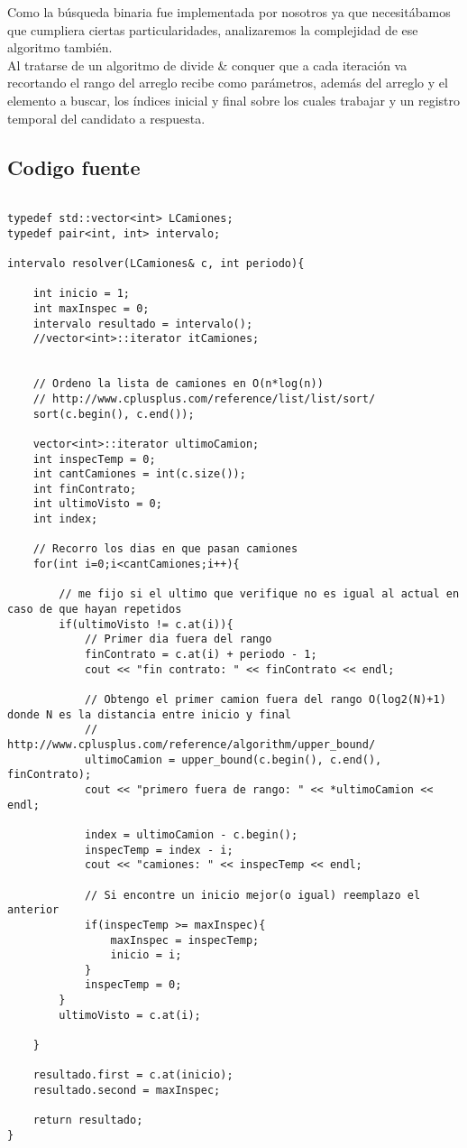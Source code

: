 Como la b\'usqueda binaria fue implementada por nosotros ya que necesit\'abamos que cumpliera ciertas particularidades, analizaremos la complejidad de ese algoritmo tambi\'en.\\
Al tratarse de un algoritmo de divide \& conquer que a cada iteraci\'on va recortando el rango del arreglo recibe como par\'ametros, adem\'as del arreglo y el elemento a buscar, los \'indices inicial y final sobre los cuales trabajar y un registro temporal del candidato a respuesta.

\subsection{Codigo fuente}

\begin{lstlisting}

typedef std::vector<int> LCamiones;
typedef pair<int, int> intervalo;

intervalo resolver(LCamiones& c, int periodo){
	
	int inicio = 1;
	int maxInspec = 0;
	intervalo resultado = intervalo();
	//vector<int>::iterator itCamiones;


	// Ordeno la lista de camiones en O(n*log(n))
	// http://www.cplusplus.com/reference/list/list/sort/
	sort(c.begin(), c.end());

	vector<int>::iterator ultimoCamion;
	int inspecTemp = 0;
	int cantCamiones = int(c.size());
	int finContrato;
	int ultimoVisto = 0;
	int index;

	// Recorro los dias en que pasan camiones
	for(int i=0;i<cantCamiones;i++){
		
		// me fijo si el ultimo que verifique no es igual al actual en caso de que hayan repetidos
		if(ultimoVisto != c.at(i)){
			// Primer dia fuera del rango
			finContrato = c.at(i) + periodo - 1;
			cout << "fin contrato: " << finContrato << endl;
			
			// Obtengo el primer camion fuera del rango O(log2(N)+1) donde N es la distancia entre inicio y final
			// http://www.cplusplus.com/reference/algorithm/upper_bound/
			ultimoCamion = upper_bound(c.begin(), c.end(), finContrato);
			cout << "primero fuera de rango: " << *ultimoCamion << endl;
			
			index = ultimoCamion - c.begin();
			inspecTemp = index - i;
			cout << "camiones: " << inspecTemp << endl;

			// Si encontre un inicio mejor(o igual) reemplazo el anterior
			if(inspecTemp >= maxInspec){
				maxInspec = inspecTemp;
				inicio = i;
			}
			inspecTemp = 0;
		}
		ultimoVisto = c.at(i);

	}

	resultado.first = c.at(inicio);
	resultado.second = maxInspec;
	
	return resultado;
}

\end{lstlisting}

